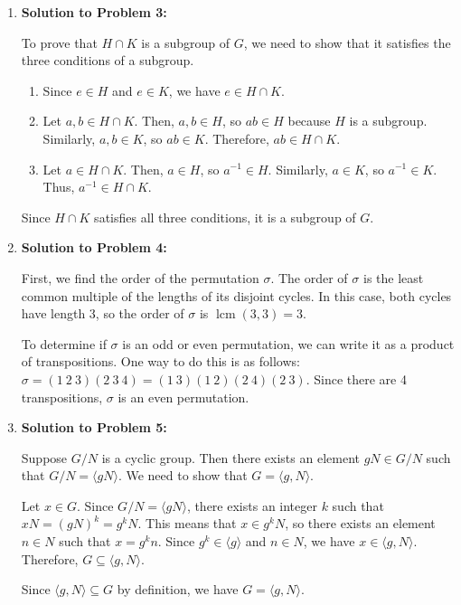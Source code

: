 \begin{enumerate}
  \item \textbf{Solution to Problem 3:}

  To prove that $H \cap K$ is a subgroup of $G$, we need to show that it satisfies the three conditions of a subgroup.

  \begin{enumerate}
    \item Since $e \in H$ and $e \in K$, we have $e \in H \cap K$.
    \item Let $a, b \in H \cap K$. Then, $a, b \in H$, so $ab \in H$ because $H$ is a subgroup. Similarly, $a, b \in K$, so $ab \in K$. Therefore, $ab \in H \cap K$.
    \item Let $a \in H \cap K$. Then, $a \in H$, so $a^{-1} \in H$. Similarly, $a \in K$, so $a^{-1} \in K$. Thus, $a^{-1} \in H \cap K$.
  \end{enumerate}

  Since $H \cap K$ satisfies all three conditions, it is a subgroup of $G$.

  \item \textbf{Solution to Problem 4:}

  First, we find the order of the permutation $\sigma$. The order of $\sigma$ is the least common multiple of the lengths of its disjoint cycles. In this case, both cycles have length 3, so the order of $\sigma$ is $\operatorname{lcm}(3, 3) = 3$.

  To determine if $\sigma$ is an odd or even permutation, we can write it as a product of transpositions. One way to do this is as follows: $\sigma = (1\ 2\ 3)(2\ 3\ 4) = (1\ 3)(1\ 2)(2\ 4)(2\ 3)$. Since there are 4 transpositions, $\sigma$ is an even permutation.

  \item \textbf{Solution to Problem 5:}

  Suppose $G/N$ is a cyclic group. Then there exists an element $gN \in G/N$ such that $G/N = \langle gN \rangle$. We need to show that $G = \langle g, N \rangle$.

  Let $x \in G$. Since $G/N = \langle gN \rangle$, there exists an integer $k$ such that $xN = (gN)^k = g^kN$. This means that $x \in g^kN$, so there exists an element $n \in N$ such that $x = g^k n$. Since $g^k \in \langle g \rangle$ and $n \in N$, we have $x \in \langle g, N \rangle$. Therefore, $G \subseteq \langle g, N \rangle$.

  Since $\langle g, N \rangle \subseteq G$ by definition, we have $G = \langle g, N \rangle$.
\end{enumerate}


